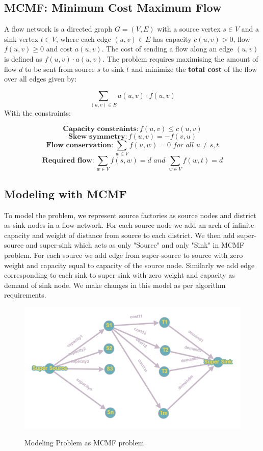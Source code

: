 \documentclass{article}
\begin{document}
\subsection{MCMF: Minimum Cost Maximum Flow}

A flow network is a directed graph $G=(V,E)$ with a source vertex $s \in V$ and a sink vertex $t \in V$, where each edge $(u,v) \in E$ has capacity $c(u,v) > 0$, flow $f(u,v) \ge 0$ and cost $a(u,v)$. The cost of sending a flow along an edge $(u,v)$ is defined as $f(u,v)\cdot a(u,v)$. The problem requires maximising the amount of flow $d$ to be sent from source $s$ to sink $t$ and minimize the \textbf{total cost} of the flow over all edges given by:

\[\sum_{(u,v) \in E} a(u,v) \cdot f(u,v)\]
With the constraints:

\[\textbf{Capacity constraints:}  \,f(u,v) \le c(u,v)\]
\[\textbf{Skew symmetry:} \,f(u,v) = - f(v,u)\]
\[\textbf{Flow conservation:}  \,\sum_{w \in V} f(u,w) = 0 \textit{ for all } u \neq s, t\]
\[\textbf{Required flow:}  \,\sum_{w \in V} f(s,w) = d \textit{ and } \sum_{w \in V} f(w,t) = d\]

\subsection{Modeling with MCMF}
To model the problem, we represent source factories as source nodes and district as sink nodes in a flow network. For each source node we add an arch of infinite capacity and weight of distance from source to each district. We then add super-source and super-sink which acts as only "Source" and only "Sink" in MCMF problem. For each source we add edge from super-source to source with zero weight and capacity equal to capacity of the source node. Similarly we add edge corresponding to each sink to super-sink with zero weight and capacity as demand of sink node. We make changes in this model as per algorithm requirements.

\begin{figure}[h]
\centering
  \includegraphics[width=0.6\linewidth]{model.png}
\label{fig:sub1}
\caption{Modeling Problem as MCMF problem }
\label{fig:test}
\end{figure}
\end{document}
